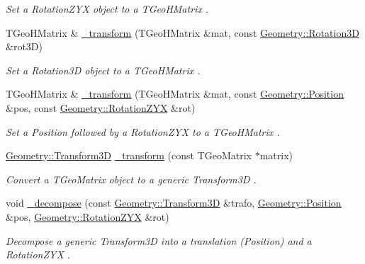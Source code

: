 \begin{DoxyCompactItemize}
\begin{DoxyCompactList}\small\item\em Set a Rotation\+Z\+YX object to a T\+Geo\+H\+Matrix . \end{DoxyCompactList}\item 
T\+Geo\+H\+Matrix \& \hyperlink{group___d_d4_h_e_p___g_e_o_m_e_t_r_y_ga249607824f27e539ae7a6d93d367afc6}{\+\_\+transform} (T\+Geo\+H\+Matrix \&mat, const \hyperlink{namespace_d_d4hep_1_1_geometry_a022fecb763315fa2bf39cbb648944a0e}{Geometry\+::\+Rotation3D} \&rot3D)
\begin{DoxyCompactList}\small\item\em Set a Rotation3D object to a T\+Geo\+H\+Matrix . \end{DoxyCompactList}\item 
T\+Geo\+H\+Matrix \& \hyperlink{group___d_d4_h_e_p___g_e_o_m_e_t_r_y_ga71170881a8a2e3803a68f7e55d237188}{\+\_\+transform} (T\+Geo\+H\+Matrix \&mat, const \hyperlink{namespace_d_d4hep_1_1_geometry_a55083902099d03506c6db01b80404900}{Geometry\+::\+Position} \&pos, const \hyperlink{namespace_d_d4hep_1_1_geometry_a24667b2b9c3cec3d5239828db4d52189}{Geometry\+::\+Rotation\+Z\+YX} \&rot)
\begin{DoxyCompactList}\small\item\em Set a Position followed by a Rotation\+Z\+YX to a T\+Geo\+H\+Matrix . \end{DoxyCompactList}\item 
\hyperlink{namespace_d_d4hep_1_1_geometry_aeb4c0356d12fd7be49a0aae50514e64b}{Geometry\+::\+Transform3D} \hyperlink{group___d_d4_h_e_p___g_e_o_m_e_t_r_y_ga7d9b7297bf0cee38d702a6e460a030a1}{\+\_\+transform} (const T\+Geo\+Matrix $\ast$matrix)
\begin{DoxyCompactList}\small\item\em Convert a T\+Geo\+Matrix object to a generic Transform3D . \end{DoxyCompactList}\item 
void \hyperlink{group___d_d4_h_e_p___g_e_o_m_e_t_r_y_ga9bb962c6fc39a0f8fc76420e08d24c7a}{\+\_\+decompose} (const \hyperlink{namespace_d_d4hep_1_1_geometry_aeb4c0356d12fd7be49a0aae50514e64b}{Geometry\+::\+Transform3D} \&trafo, \hyperlink{namespace_d_d4hep_1_1_geometry_a55083902099d03506c6db01b80404900}{Geometry\+::\+Position} \&pos, \hyperlink{namespace_d_d4hep_1_1_geometry_a24667b2b9c3cec3d5239828db4d52189}{Geometry\+::\+Rotation\+Z\+YX} \&rot)
\begin{DoxyCompactList}\small\item\em Decompose a generic Transform3D into a translation (Position) and a Rotation\+Z\+YX . \end{DoxyCompactList}\item 

\end{DoxyCompactItemize}
